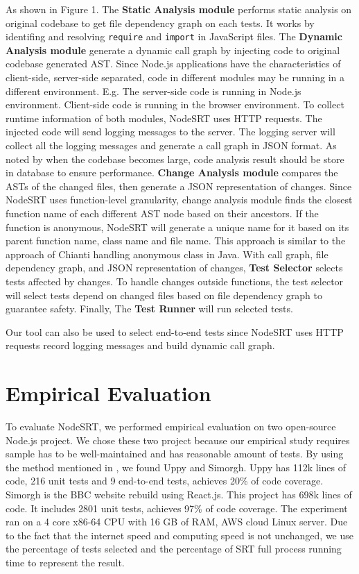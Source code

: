 \documentclass[10pt, conference]{IEEEtran}
\begin{document}
As shown in Figure 1. The \textbf{Static Analysis module} performs static analysis on original codebase to get file dependency
graph on each tests. It works by identifing and resolving \verb|require| and \verb|import| in JavaScript files. The \textbf{Dynamic Analysis module} generate a dynamic call graph by injecting code to original codebase 
generated AST. Since Node.js applications have the characteristics of client-side, server-side separated, code in 
different modules may be running in a different environment. E.g. The server-side code is running in Node.js 
environment. Client-side code is running in the browser environment. To collect runtime information of both 
modules, NodeSRT uses HTTP requests. The injected code will send logging messages to the server. The logging server will 
collect all the logging messages and generate a call graph in JSON format. As noted by \cite{b2, b4} when the codebase 
becomes large, code analysis result should be store in database to ensure performance. \textbf{Change Analysis module} 
compares the ASTs of the changed files, then generate a JSON representation of changes. Since NodeSRT uses function-level 
granularity, change analysis module finds the closest function name of each different AST node based on their ancestors. 
If the function is anonymous, NodeSRT will generate a unique name for it based on its parent function name, class name and file name. 
This approach is similar to the approach of Chianti \cite{b12} handling anonymous class in Java. With call graph, file dependency graph, 
and JSON representation of changes, \textbf{Test Selector} selects tests affected by changes. To handle changes outside 
functions, the test selector will select tests depend on changed files based on file dependency graph to guarantee safety. 
Finally, The \textbf{Test Runner} will run selected tests.

Our tool can also be used to select end-to-end tests since NodeSRT uses HTTP requests 
record logging messages and build dynamic call graph.

\section{Empirical Evaluation}

To evaluate NodeSRT, we performed empirical evaluation on two open-source Node.js project. We chose these two project because 
our empirical study requires sample has to be well-maintained and has reasonable amount of tests. By using the method mentioned in \cite{b10}, 
we found Uppy and Simorgh. Uppy has 112k lines of code, 216 unit tests and 9 end-to-end tests, 
achieves 20\% of code coverage. Simorgh is the BBC website rebuild using React.js. This project has 698k lines of code. 
It includes 2801 unit tests, achieves 97\% of code coverage. The 
experiment ran on a 4 core x86-64 CPU with 16 GB of RAM, AWS cloud Linux server. Due to the fact that the internet speed and computing speed is not 
unchanged, we use the percentage of tests selected and the percentage of SRT full process running time to 
represent the result. 
\end{document}
